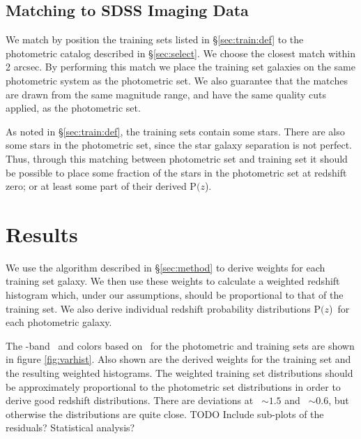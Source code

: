 \documentclass[preprint]{aastex}
\newcommand{\pofz}{P$(z$)}
\newcommand{\matchrad}{2 arcsec}
\begin{document}
\subsection{Matching to SDSS Imaging Data} \label{sec:train:match}

We match by position the training sets listed in \S \ref{sec:train:def} to the
photometric catalog described in \S \ref{sec:select}.  We choose the closest
match within \matchrad.  By performing this match we place the training set
galaxies on the same photometric system as the photometric set.  We also
guarantee that the matches are drawn from the same magnitude range, and
have the same quality cuts applied, as the photometric set.

As noted in \S \ref{sec:train:def}, the training sets contain some stars.
There are also some stars in the photometric set, since the star galaxy
separation is not perfect.  Thus, through this matching between photometric set
and training set it should be possible to place some fraction of the stars in
the photometric set at redshift zero; or at least some part of their derived
\pofz.

\section{Results}

We use the algorithm described in \S \ref{sec:method} to derive weights for
each training set galaxy.  We then use these weights to calculate a weighted
redshift histogram which, under our assumptions, should be proportional to that
of the training set.  We also derive individual redshift probability
distributions \pofz\ for each photometric galaxy.

The \rmag-band \cmodelmag\ and colors based on \modelmag\ for the photometric
and training sets are shown in figure \ref{fig:varhist}.  Also shown are the
derived weights for the training set and the resulting weighted histograms.
The weighted training set distributions should be approximately proportional to
the photometric set distributions in order to derive good redshift
distributions.  There are deviations at \gmr\ $\sim 1.5$ and \rmi\ $\sim 0.6$,
but otherwise the distributions are quite close. TODO Include sub-plots of
the residuals?  Statistical analysis?
\end{document}

